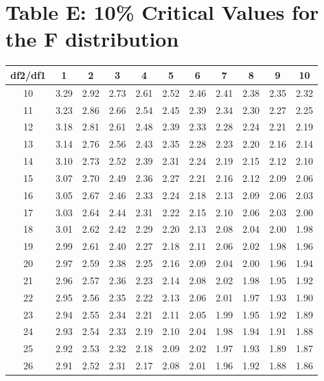 \documentclass[
]{book}
\theoremstyle{definition}
\theoremstyle{definition}
\theoremstyle{definition}
\theoremstyle{definition}
\theoremstyle{remark}
\begin{document}
\hypertarget{table-e-10-critical-values-for-the-f-distribution}{%
\section*{Table E: 10\% Critical Values for the F distribution}\label{table-e-10-critical-values-for-the-f-distribution}}

\begin{longtable}[]{@{}ccccccccccc@{}}
\toprule()
df2/df1 & 1 & 2 & 3 & 4 & 5 & 6 & 7 & 8 & 9 & 10 \\
\midrule()
\endhead
10 & 3.29 & 2.92 & 2.73 & 2.61 & 2.52 & 2.46 & 2.41 & 2.38 & 2.35 & 2.32 \\
11 & 3.23 & 2.86 & 2.66 & 2.54 & 2.45 & 2.39 & 2.34 & 2.30 & 2.27 & 2.25 \\
12 & 3.18 & 2.81 & 2.61 & 2.48 & 2.39 & 2.33 & 2.28 & 2.24 & 2.21 & 2.19 \\
13 & 3.14 & 2.76 & 2.56 & 2.43 & 2.35 & 2.28 & 2.23 & 2.20 & 2.16 & 2.14 \\
14 & 3.10 & 2.73 & 2.52 & 2.39 & 2.31 & 2.24 & 2.19 & 2.15 & 2.12 & 2.10 \\
15 & 3.07 & 2.70 & 2.49 & 2.36 & 2.27 & 2.21 & 2.16 & 2.12 & 2.09 & 2.06 \\
16 & 3.05 & 2.67 & 2.46 & 2.33 & 2.24 & 2.18 & 2.13 & 2.09 & 2.06 & 2.03 \\
17 & 3.03 & 2.64 & 2.44 & 2.31 & 2.22 & 2.15 & 2.10 & 2.06 & 2.03 & 2.00 \\
18 & 3.01 & 2.62 & 2.42 & 2.29 & 2.20 & 2.13 & 2.08 & 2.04 & 2.00 & 1.98 \\
19 & 2.99 & 2.61 & 2.40 & 2.27 & 2.18 & 2.11 & 2.06 & 2.02 & 1.98 & 1.96 \\
20 & 2.97 & 2.59 & 2.38 & 2.25 & 2.16 & 2.09 & 2.04 & 2.00 & 1.96 & 1.94 \\
21 & 2.96 & 2.57 & 2.36 & 2.23 & 2.14 & 2.08 & 2.02 & 1.98 & 1.95 & 1.92 \\
22 & 2.95 & 2.56 & 2.35 & 2.22 & 2.13 & 2.06 & 2.01 & 1.97 & 1.93 & 1.90 \\
23 & 2.94 & 2.55 & 2.34 & 2.21 & 2.11 & 2.05 & 1.99 & 1.95 & 1.92 & 1.89 \\
24 & 2.93 & 2.54 & 2.33 & 2.19 & 2.10 & 2.04 & 1.98 & 1.94 & 1.91 & 1.88 \\
25 & 2.92 & 2.53 & 2.32 & 2.18 & 2.09 & 2.02 & 1.97 & 1.93 & 1.89 & 1.87 \\
26 & 2.91 & 2.52 & 2.31 & 2.17 & 2.08 & 2.01 & 1.96 & 1.92 & 1.88 & 1.86 \\

\end{longtable}
\end{document}

